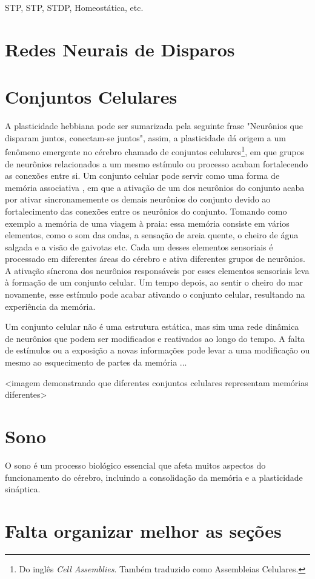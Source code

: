 STP, STP, STDP, Homeostática, etc.

\section{Redes Neurais de Disparos}

\section{Conjuntos Celulares}

A plasticidade hebbiana pode ser sumarizada pela seguinte frase "Neurônios que disparam juntos, conectam-se juntos", assim, a
plasticidade dá origem a um fenômeno emergente no cérebro chamado de conjuntos celulares\footnote{Do inglês \textit{Cell
Assemblies}. Também traduzido como Assembleias Celulares.}, em que grupos de neurônios relacionados a um mesmo estímulo ou
processo acabam fortalecendo as conexões entre si. Um conjunto celular pode servir como uma forma de memória associativa
\cite{sakuraiMultiple2018}, em que a ativação de um dos neurônios do conjunto acaba por ativar sincronamemente os demais neurônios
do conjunto devido ao fortalecimento das conexões entre os neurônios do conjunto. Tomando como exemplo a memória de uma viagem à
praia: essa memória consiste em vários elementos, como o som das ondas, a sensação de areia quente, o cheiro de água salgada e a
visão de gaivotas etc. Cada um desses elementos sensoriais é processado em diferentes áreas do cérebro e ativa diferentes grupos
de neurônios. A ativação síncrona dos neurônios responsáveis por esses elementos sensoriais leva à formação de um conjunto
celular. Um tempo depois, ao sentir o cheiro do mar novamente, esse estímulo pode acabar ativando o conjunto celular, resultando
na experiência da memória.

Um conjunto celular não é uma estrutura estática, mas sim uma rede dinâmica de neurônios que podem ser modificados e reativados ao
longo do tempo. A falta de estímulos ou a exposição a novas informações pode levar a uma modificação ou mesmo ao esquecimento de
partes da memória {...} 

<imagem demonstrando que diferentes conjuntos celulares representam memórias diferentes>


\section{Sono}

O sono é um processo biológico essencial que afeta muitos aspectos do funcionamento do cérebro, incluindo a consolidação da
memória e a plasticidade sináptica.

\section{Falta organizar melhor as seções}